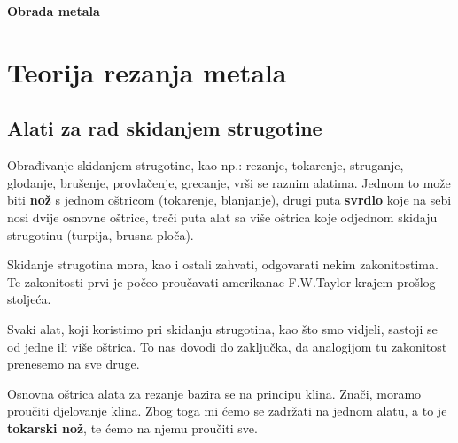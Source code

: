 \documentclass[a4paper,12pt]{article}
\numberwithin{figure}{section}
\begin{document}
\begin{titlepage}
  \null\vfill

  \begin{center}

  {\huge\bfseries Obrada metala}
  \vskip 2cm
  
  \end{center}
\vfill
\hfill
\end{titlepage}
\clearpage
\tableofcontents
\clearpage
\section{Teorija rezanja metala}
\subsection{Alati za rad skidanjem strugotine}
Obrađivanje skidanjem strugotine, kao np.: rezanje, tokarenje, struganje, glodanje, brušenje, provlačenje, grecanje, vrši se raznim alatima. Jednom to može biti \textbf{nož} s jednom oštricom (tokarenje, blanjanje), drugi puta \textbf{svrdlo} koje na sebi nosi dvije osnovne oštrice, treči puta alat sa više oštrica koje odjednom skidaju strugotinu (turpija, brusna ploča). \par 
Skidanje strugotina mora, kao i ostali zahvati, odgovarati nekim zakonitostima. Te zakonitosti prvi je počeo proučavati amerikanac F.W.Taylor krajem prošlog stoljeća.\par
Svaki alat, koji koristimo pri skidanju strugotina, kao što smo vidjeli, sastoji se od jedne ili više oštrica. To nas dovodi do zaključka, da analogijom tu zakonitost prenesemo na sve druge.\par
Osnovna oštrica alata za rezanje bazira se na principu klina. Znači, moramo proučiti djelovanje klina. Zbog toga mi ćemo se zadržati na jednom alatu, a to je \textbf{tokarski nož}, te ćemo na njemu proučiti sve.
\end{document}
